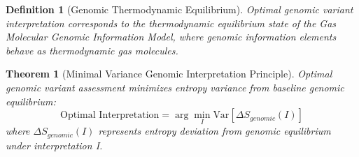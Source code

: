 \documentclass[12pt,a4paper]{article}
\newtheorem{theorem}{Theorem}
\newtheorem{definition}{Definition}
\begin{document}
\begin{definition}[Genomic Thermodynamic Equilibrium]
Optimal genomic variant interpretation corresponds to the thermodynamic equilibrium state of the Gas Molecular Genomic Information Model, where genomic information elements behave as thermodynamic gas molecules.
\end{definition}

\begin{theorem}[Minimal Variance Genomic Interpretation Principle]
Optimal genomic variant assessment minimizes entropy variance from baseline genomic equilibrium:
\begin{equation}
\text{Optimal Interpretation} = \arg\min_I \text{Var}[\Delta S_{genomic}(I)]
\end{equation}
where $\Delta S_{genomic}(I)$ represents entropy deviation from genomic equilibrium under interpretation I.
\end{theorem}
\end{document}
